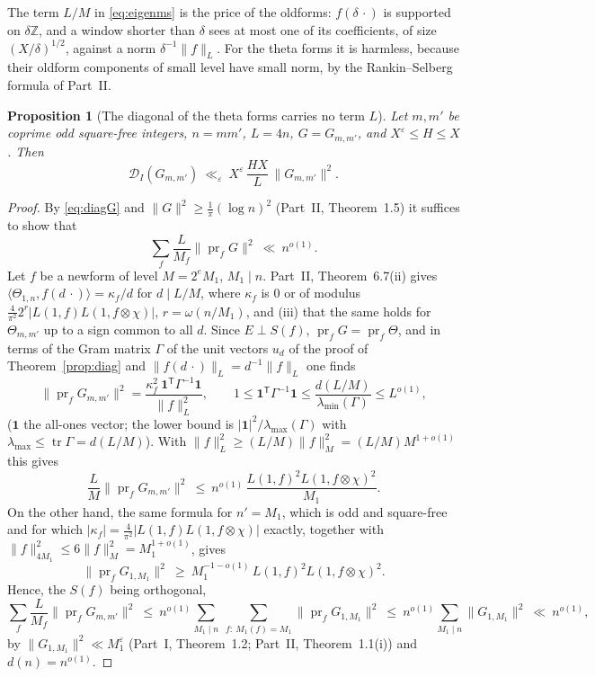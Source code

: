 \documentclass[11pt]{amsart}
\newtheorem{proposition}[theorem]{Proposition}
\theoremstyle{remark}
\newcommand{\Z}{\mathbb{Z}}
\newcommand{\e}{\varepsilon}
\DeclareMathOperator{\pr}{pr}
\DeclareMathOperator{\tr}{tr}
\begin{document}
The term $L/M$ in \eqref{eq:eigenms} is the price of the oldforms: $f(\delta\,\cdot)$ is supported on $\delta\Z$, and a window shorter than $\delta$ sees at most one of its coefficients, of size $(X/\delta)^{1/2}$, against a norm $\delta^{-1}\|f\|_L$. For the theta forms it is harmless, because their oldform components of small level have small norm, by the Rankin--Selberg formula of Part~II.

\begin{proposition}[The diagonal of the theta forms carries no term $L$]\label{prop:diagtheta}
Let $m,m'$ be coprime odd square-free integers, $n=mm'$, $L=4n$, $G=G_{m,m'}$, and $X^{\e}\le H\le X$. Then
\[
\mathcal D_I(G_{m,m'})\ \ll_\e\ X^{\e}\,\frac{HX}{L}\,\|G_{m,m'}\|^2 .
\]
\end{proposition}
\begin{proof}
By \eqref{eq:diagG} and $\|G\|^2\ge\frac1\pi(\log n)^2$ (Part~II, Theorem~1.5) it suffices to show that
\[
\sum_f\frac L{M_f}\|\pr_fG\|^2\ \ll\ n^{o(1)} .
\]
Let $f$ be a newform of level $M=2^eM_1$, $M_1\mid n$. Part~II, Theorem~6.7(ii) gives $\langle\Theta_{1,n},f(d\,\cdot)\rangle=\kappa_f/d$ for $d\mid L/M$, where $\kappa_f$ is $0$ or of modulus $\frac4{\pi^2}2^{r}|L(1,f)L(1,f\otimes\chi)|$, $r=\omega(n/M_1)$, and (iii) that the same holds for $\Theta_{m,m'}$ up to a sign common to all $d$. Since $E\perp S(f)$, $\pr_fG=\pr_f\Theta$, and in terms of the Gram matrix $\Gamma$ of the unit vectors $u_d$ of the proof of Theorem~\ref{prop:diag} and $\|f(d\,\cdot)\|_L=d^{-1}\|f\|_L$ one finds
\[
\|\pr_fG_{m,m'}\|^2=\frac{\kappa_f^2\ \mathbf 1^{\mathsf T}\Gamma^{-1}\mathbf 1}{\|f\|_L^2},\qquad 1\le\mathbf 1^{\mathsf T}\Gamma^{-1}\mathbf 1\le\frac{d(L/M)}{\lambda_{\min}(\Gamma)}\le L^{o(1)},
\]
($\mathbf 1$ the all-ones vector; the lower bound is $|\mathbf 1|^2/\lambda_{\max}(\Gamma)$ with $\lambda_{\max}\le\tr\Gamma=d(L/M)$). With $\|f\|_L^2\ge(L/M)\|f\|_M^2=(L/M)M^{1+o(1)}$ this gives
\[
\frac LM\|\pr_fG_{m,m'}\|^2\ \le\ n^{o(1)}\,\frac{L(1,f)^2L(1,f\otimes\chi)^2}{M_1}.
\]
On the other hand, the same formula for $n'=M_1$, which is odd and square-free and for which $|\kappa_f|=\frac4{\pi^2}|L(1,f)L(1,f\otimes\chi)|$ exactly, together with $\|f\|^2_{4M_1}\le6\|f\|_M^2=M_1^{1+o(1)}$, gives
\[
\|\pr_fG_{1,M_1}\|^2\ \ge\ M_1^{-1-o(1)}\,L(1,f)^2L(1,f\otimes\chi)^2 .
\]
Hence, the $S(f)$ being orthogonal,
\[
\sum_f\frac L{M_f}\|\pr_fG_{m,m'}\|^2\ \le\ n^{o(1)}\sum_{M_1\mid n}\ \sum_{f:\ M_1(f)=M_1}\|\pr_fG_{1,M_1}\|^2\ \le\ n^{o(1)}\sum_{M_1\mid n}\|G_{1,M_1}\|^2\ \ll\ n^{o(1)},
\]
by $\|G_{1,M_1}\|^2\ll M_1^{\e}$ (Part~I, Theorem~1.2; Part~II, Theorem~1.1(i)) and $d(n)=n^{o(1)}$.
\end{proof}
\end{document}
